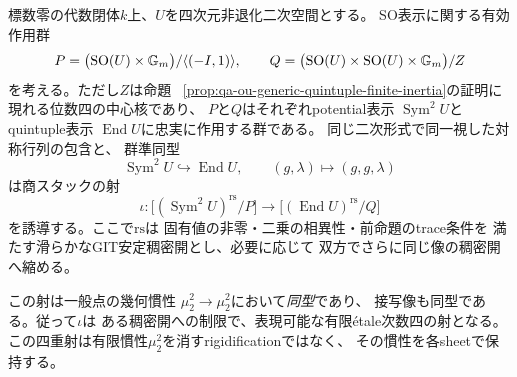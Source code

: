 \begin{theorem}[potentialからquintupleへの一般四重射のスタック的エタール性]
\label{thm:qa-ou-rigid-potential-quintuple-generic-etale}
標数零の代数閉体$k$上、$U$を四次元非退化二次空間とする。
SO表示に関する有効作用群
\[
 P=\bigl(\operatorname{SO}(U)\times\mathbb G_m\bigr)/
           \langle(-I,1)\rangle,\qquad
 Q=\bigl(\operatorname{SO}(U)\times\operatorname{SO}(U)\times\mathbb G_m\bigr)/Z
\]
を考える。ただし$Z$は命題
~\ref{prop:qa-ou-generic-quintuple-finite-inertia}の証明に
現れる位数四の中心核であり、
$P$と$Q$はそれぞれpotential表示
$\operatorname{Sym}^2U$とquintuple表示
$\operatorname{End}U$に忠実に作用する群である。
同じ二次形式で同一視した対称行列の包含と、
群準同型
\[
 \operatorname{Sym}^2U\hookrightarrow\operatorname{End}U,
 \qquad (g,\lambda)\longmapsto(g,g,\lambda)
\]
は商スタックの射
\[
 \iota:\bigl[(\operatorname{Sym}^2U)^{\mathrm{rs}}/P\bigr]
       \longrightarrow
       \bigl[(\operatorname{End}U)^{\mathrm{rs}}/Q\bigr]
 \tag{OU-stack-4}\label{eq:qa-ou-generic-stack-fourfold}
\]
を誘導する。ここで$\mathrm{rs}$は
固有値の非零・二乗の相異性・前命題のtrace条件を
満たす滑らかなGIT安定稠密開とし、必要に応じて
双方でさらに同じ像の稠密開へ縮める。

この射は一般点の幾何慣性
$\mu_2^2\to\mu_2^2$において\emph{同型}であり、
接写像も同型である。従って$\iota$は
ある稠密開への制限で、表現可能な有限étale次数四の射となる。
この四重射は有限慣性$\mu_2^2$を消すrigidificationではなく、
その慣性を各sheetで保持する。
\end{theorem}
